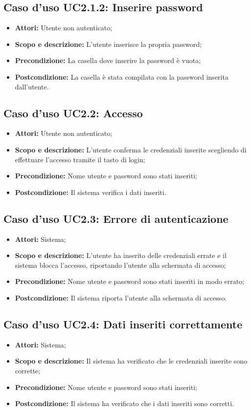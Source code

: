 \subsection{Caso d'uso UC2.1.2: Inserire password}
\begin{itemize}
	\item \textbf{Attori:} Utente non autenticato;
	\item \textbf{Scopo e descrizione:} L'utente inserisce la propria password;
	\item \textbf{Precondizione:} La casella dove inserire la password è vuota;
	\item \textbf{Postcondizione:} La casella è stata compilata con la password inserita dall'utente.
\end{itemize}

\subsection{Caso d'uso UC2.2: Accesso}
\begin{itemize}
	\item \textbf{Attori:} Utente non autenticato;
	\item \textbf{Scopo e descrizione:} L'utente conferma le credenziali inserite scegliendo di effettuare l'accesso tramite il tasto di login;
	\item \textbf{Precondizione:} Nome utente e password sono stati inseriti;
	\item \textbf{Postcondizione:} Il sistema verifica i dati inseriti.
\end{itemize}

\subsection{Caso d'uso UC2.3: Errore di autenticazione}
\begin{itemize}
	\item \textbf{Attori:} Sistema;
	\item \textbf{Scopo e descrizione:} L'utente ha inserito delle credenziali errate e il sistema blocca l'accesso, riportando l'utente alla schermata di accesso;
	\item \textbf{Precondizione:} Nome utente e password sono stati inseriti in modo errato;
	\item \textbf{Postcondizione:} Il sistema riporta l'utente alla schermata di accesso.
\end{itemize}

\subsection{Caso d'uso UC2.4: Dati inseriti correttamente}
\begin{itemize}
	\item \textbf{Attori:} Sistema;
	\item \textbf{Scopo e descrizione:} Il sistema ha verificato che le credenziali inserite sono corrette;
	\item \textbf{Precondizione:} Nome utente e password sono stati inseriti;
	\item \textbf{Postcondizione:} Il sistema ha verificato che i dati inseriti sono corretti.
\end{itemize}

